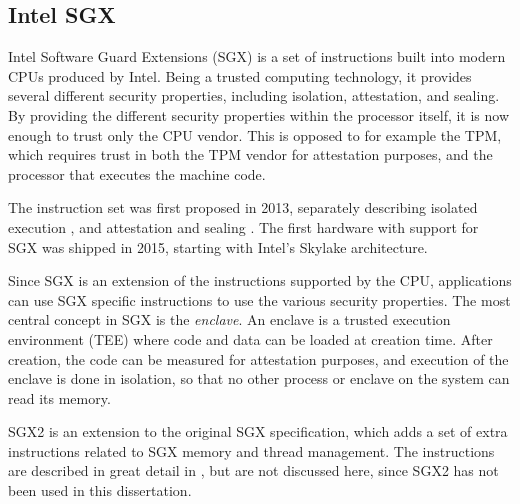 \subsection{Intel SGX}
\label{sec:kappa-sgx}

\newcommand{\sgxcommand}[1]{\texttt{#1}}
\newcommand{\sgxadd}{\sgxcommand{EADD}}
\newcommand{\sgxcreate}{\sgxcommand{ECREATE}}
\newcommand{\sgxenter}{\sgxcommand{EENTER}}
\newcommand{\sgxexit}{\sgxcommand{EEXIT}}
\newcommand{\sgxextend}{\sgxcommand{EEXTEND}}
\newcommand{\sgxgetkey}{\sgxcommand{EGETKEY}}
\newcommand{\sgxinit}{\sgxcommand{EINIT}}
\newcommand{\sgxremove}{\sgxcommand{EREMOVE}}
\newcommand{\sgxreport}{\sgxcommand{EREPORT}}
\newcommand{\sgxresume}{\sgxcommand{ERESUME}}
\newcommand{\sgxmrenclave}{\sgxcommand{MRENCLAVE}}
\newcommand{\sgxmrsigner}{\sgxcommand{MRSIGNER}}

Intel Software Guard Extensions (SGX) is a set of instructions built into modern CPUs produced by Intel.
Being a trusted computing technology, it provides several different security properties, including isolation, attestation, and sealing.
By providing the different security properties within the processor itself, it is now enough to trust only the CPU vendor.
This is opposed to for example the TPM, which requires trust in both the TPM vendor for attestation purposes, and the processor that executes the machine code.

The instruction set was first proposed in 2013, separately describing isolated execution \cite{mckeen:2013}, and attestation and sealing \cite{anati:2013}.
The first hardware with support for SGX was shipped in 2015, starting with Intel's Skylake architecture.

Since SGX is an extension of the instructions supported by the CPU, applications can use SGX specific instructions to use the various security properties.
The most central concept in SGX is the \emph{enclave}.
An enclave is a trusted execution environment (TEE) where code and data can be loaded at creation time.
After creation, the code can be measured for attestation purposes, and execution of the enclave is done in isolation, so that no other process or enclave on the system can read its memory.

SGX2 is an extension to the original SGX specification, which adds a set of extra instructions related to SGX memory and thread management.
The instructions are described in great detail in \cite{intel64b}, but are not discussed here, since SGX2 has not been used in this dissertation.

